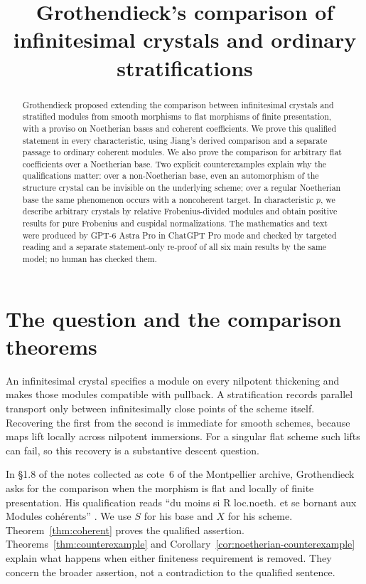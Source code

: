 \documentclass[11pt]{article}
\title{Grothendieck's comparison of infinitesimal crystals and ordinary stratifications}
\author{}\date{}
\theoremstyle{definition}\newtheorem{definition}[theorem]{Definition}
\theoremstyle{remark}\newtheorem{remark}[theorem]{Remark}
\begin{document}
\maketitle
\begin{abstract}
Grothendieck proposed extending the comparison between infinitesimal crystals and stratified modules from smooth morphisms to flat morphisms of finite presentation, with a proviso on Noetherian bases and coherent coefficients. We prove this qualified statement in every characteristic, using Jiang's derived comparison and a separate passage to ordinary coherent modules. We also prove the comparison for arbitrary flat coefficients over a Noetherian base. Two explicit counterexamples explain why the qualifications matter: over a non-Noetherian base, even an automorphism of the structure crystal can be invisible on the underlying scheme; over a regular Noetherian base the same phenomenon occurs with a noncoherent target. In characteristic $p$, we describe arbitrary crystals by relative Frobenius-divided modules and obtain positive results for pure Frobenius and cuspidal normalizations. The mathematics and text were produced by GPT-6 Astra Pro in ChatGPT Pro mode and checked by targeted reading and a separate statement-only re-proof of all six main results by the same model; no human has checked them.
\end{abstract}

\section{The question and the comparison theorems}

An infinitesimal crystal specifies a module on every nilpotent thickening and makes those modules compatible with pullback. A stratification records parallel transport only between infinitesimally close points of the scheme itself. Recovering the first from the second is immediate for smooth schemes, because maps lift locally across nilpotent immersions. For a singular flat scheme such lifts can fail, so this recovery is a substantive descent question.

In \S1.8 of the notes collected as cote~6 of the Montpellier archive, Grothendieck asks for the comparison when the morphism is flat and locally of finite presentation. His qualification reads ``du moins si R loc.noeth. et se bornant aux Modules coh\'erents'' \citep[archive sheet~6, PDF image~7]{GrothendieckNotes}. We use $S$ for his base and $X$ for his scheme. Theorem~\ref{thm:coherent} proves the qualified assertion. Theorems~\ref{thm:counterexample} and Corollary~\ref{cor:noetherian-counterexample} explain what happens when either finiteness requirement is removed. They concern the broader assertion, not a contradiction to the qualified sentence.
\end{document}
